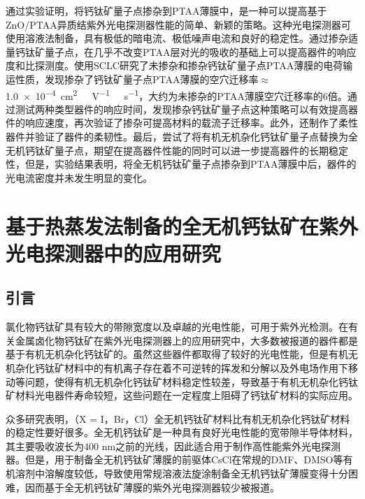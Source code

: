 \documentclass[forlib]{WHUMaster}   %
\begin{document}
{通过实验证明，将钙钛矿量子点掺杂到PTAA薄膜中，是一种可以提高基于ZnO/PTAA异质结紫外光电探测器性能的简单、新颖的策略。这种光电探测器可使用溶液法制备，具有极低的暗电流、极低噪声电流和良好的稳定性。通过掺杂适量钙钛矿量子点，在几乎不改变PTAA层对光的吸收的基础上可以提高器件的响应度和比探测度。使用SCLC研究了未掺杂和掺杂钙钛矿量子点PTAA薄膜的电荷输运性质，发现掺杂了钙钛矿量子点PTAA薄膜的空穴迁移率$\approx$ \num{1.0e-4}\ \si{cm^2\ V^{-1}\ s^{-1}}，大约为未掺杂的PTAA薄膜空穴迁移率的6倍。通过测试两种类型器件的响应时间，发现掺杂钙钛矿量子点这种策略可以有效提高器件的响应速度，再次验证了掺杂可提高材料的载流子迁移率。此外，还制作了柔性器件并验证了器件的柔韧性。最后，尝试了将有机无机杂化钙钛矿量子点替换为全无机钙钛矿量子点，期望在提高器件性能的同时可以进一步提高器件的长期稳定性，但是，实验结果表明，将全无机钙钛矿量子点掺杂到PTAA薄膜中后，器件的光电流密度并未发生明显的变化。


\chapter{基于热蒸发法制备的全无机钙钛矿在紫外光电探测器中的应用研究}

\section{引言}

氯化物钙钛矿具有较大的带隙宽度以及卓越的光电性能，可用于紫外光检测。在有关金属卤化物钙钛矿在紫外光电探测器上的应用研究中，大多数被报道的器件都是基于有机无机杂化钙钛矿的。虽然这些器件都取得了较好的光电性能，但是有机无机杂化钙钛矿材料中的有机离子存在着不可逆转的挥发和分解\cite{RN81,RN83}以及外电场作用下移动\cite{RN84,RN85}等问题，使得有机无机杂化钙钛矿材料稳定性较差，导致基于有机无机杂化钙钛矿材料光电器件寿命较短，这些问题在一定程度上阻碍了钙钛矿材料的实际应用。

众多研究表明，（X = I，Br，Cl）全无机钙钛矿材料比有机无机杂化钙钛矿材料的稳定性要好很多\cite{RN89,RN87,RN88}。全无机钙钛矿是一种具有良好光电性能的宽带隙半导体材料，其主要吸收波长为400 nm之前的光线，因此适合用于制作高性能紫外光电探测器。但是，用于制备全无机钙钛矿薄膜的前驱体CsCl在常规的DMF、DMSO等有机溶剂中溶解度较低\cite{RN137,RN89,RN90}，导致使用常规溶液法旋涂制备全无机钙钛矿薄膜变得十分困难，因而基于全无机钙钛矿薄膜的紫外光电探测器较少被报道。

}
\end{document}
